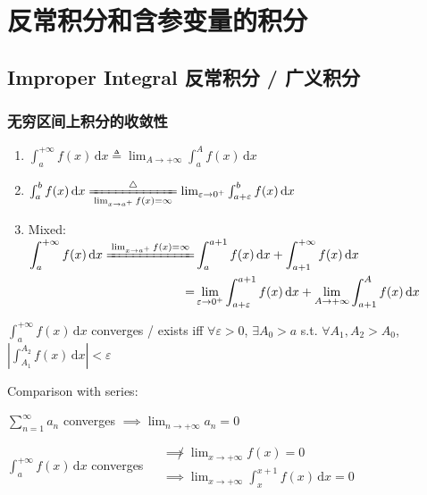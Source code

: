 \section{反常积分和含参变量的积分}
\subsection[反常积分]{Improper Integral 反常积分 / 广义积分}
\subsubsection{无穷区间上积分的收敛性}

\begin{enumerate}
    \item $\int_a^{+\infty}f(x)\,\mathrm{d}x\triangleq\lim_{A\to+\infty}\int_a^Af(x)\,\mathrm{d}x$
    \item $\int_a^bf(x)\,\mathrm{d}x\xlongequal[{\lim_{x\to a^+}f(x)=\infty}]{\triangle}\lim_{\varepsilon\to0^+}\int_{a+\varepsilon}^bf(x)\,\mathrm{d}x$
    \item Mixed: $\begin{aligned}
                  \int_a^{+\infty}f(x)\,\mathrm{d}x\xlongequal{\lim_{x\to a^+}f(x)=\infty} & \int_a^{a+1}f(x)\,\mathrm{d}x+\int_{a+1}^{+\infty}f(x)\,\mathrm{d}x                                                  \\
                  =                                                                        & \lim_{\varepsilon\to 0^+}\int_{a+\varepsilon}^{a+1}f(x)\,\mathrm{d}x+\lim_{A\to+\infty}\int_{a+1}^Af(x)\,\mathrm{d}x
              \end{aligned}$
\end{enumerate}

\begin{theorem}
    $\int_a^{+\infty}f(x)\,\mathrm{d}x$ converges / exists iff $\forall\varepsilon>0$, $\exists A_0>a$ s.t. $\forall A_1,A_2>A_0$, $\left|\int_{A_1}^{A_2}f(x)\,\mathrm{d}x\right|<\varepsilon$
\end{theorem}

Comparison with series:

$\sum_{n=1}^{\infty}a_n$ converges $\implies\lim_{n\to+\infty}a_n=0$

$\int_a^{+\infty}f(x)\,\mathrm{d}x$ converges $\begin{aligned}
         & \not\implies\lim_{x\to+\infty}f(x)=0                      \\
         & \implies\lim_{x\to+\infty}\int_x^{x+1}f(x)\,\mathrm{d}x=0
    \end{aligned}$

